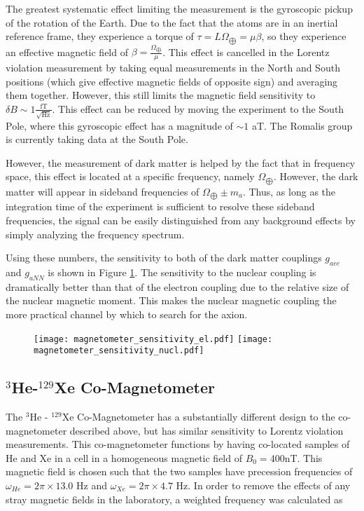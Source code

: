 \documentclass[aps,prd,final,letterpaper]{revtex4}
\begin{document}
The greatest systematic effect limiting the measurement is the gyroscopic pickup of the rotation of the Earth. Due to the fact that the atoms are in an inertial reference frame, they experience a torque of $\tau = L\Omega_{\bigoplus} = \mu \beta$, so they experience an effective magnetic field of $\beta = \frac{\Omega_{\bigoplus}}{\mu}$. This effect is cancelled in the Lorentz violation measurement by taking equal measurements in the North and South positions (which give effective magnetic fields of opposite sign) and averaging them together. However, this still limits the magnetic field sensitivity to $\delta B \sim 1 \frac{\mathrm{fT}}{\sqrt{\mathrm{Hz}}}$. This effect can be reduced by moving the experiment to the South Pole, where this gyroscopic effect has a magnitude of $\sim 1$ aT. The Romalis group is currently taking data at the South Pole.

However, the measurement of dark matter is helped by the fact that in frequency space, this effect is located at a specific frequency, namely $\Omega_{\bigoplus}$. However, the dark matter will appear in sideband frequencies of $\Omega_{\bigoplus} \pm m_a$. Thus, as long as the integration time of the experiment is sufficient to resolve these sideband frequencies, the signal can be easily distinguished from any background effects by simply analyzing the frequency spectrum. 

Using these numbers, the sensitivity to both of the dark matter couplings $g_{aee}$ and $g_{aNN}$ is shown in Figure \ref{fig:mag_sensitivity}. The sensitivity to the nuclear coupling is dramatically better than that of the electron coupling due to the relative size of the nuclear magnetic moment. This makes the nuclear magnetic coupling the more practical channel by which to search for the axion. 


\begin{figure}
\texttt{[image: magnetometer\_sensitivity\_el.pdf]}
\texttt{[image: magnetometer\_sensitivity\_nucl.pdf]}
\label{fig:mag_sensitivity}
\end{figure}


\subsection{$^{3}$He-$^{129}$Xe Co-Magnetometer}

The $^{3}$He - $^{129}$Xe Co-Magnetometer has a substantially different design to the co-magnetometer described above, but has similar sensitivity to Lorentz violation measurements. This co-magnetometer functions by having co-located samples of He and Xe in a cell in a homogeneous magnetic field of $B_0 = 400$nT. This magnetic field is chosen such that the two samples have precession frequencies of $\omega_{He} = 2\pi \times 13.0$ Hz and $\omega_{Xe} = 2\pi \times 4.7$ Hz. In order to remove the effects of any stray magnetic fields in the laboratory, a weighted frequency was calculated as
\end{document}
